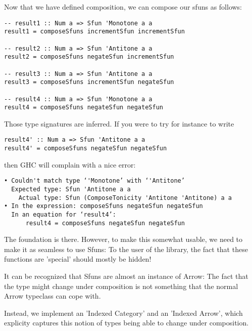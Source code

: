 \documentclass[11pt]{article}
\begin{document}
Now that we have defined composition, we can compose our sfuns as follows:

\begin{verbatim}
-- result1 :: Num a => Sfun 'Monotone a a
result1 = composeSfuns incrementSfun incrementSfun

-- result2 :: Num a => Sfun 'Antitone a a
result2 = composeSfuns negateSfun incrementSfun

-- result3 :: Num a => Sfun 'Antitone a a
result3 = composeSfuns incrementSfun negateSfun

-- result4 :: Num a => Sfun 'Monotone a a
result4 = composeSfuns negateSfun negateSfun

\end{verbatim}

Those type signatures are inferred. If you were to try for instance to write

\begin{verbatim}
result4' :: Num a => Sfun 'Antitone a a
result4' = composeSfuns negateSfun negateSfun
\end{verbatim}

then GHC will complain with a nice error:

\begin{verbatim}
• Couldn't match type ‘'Monotone’ with ‘'Antitone’
  Expected type: Sfun 'Antitone a a
    Actual type: Sfun (ComposeTonicity 'Antitone 'Antitone) a a
• In the expression: composeSfuns negateSfun negateSfun
  In an equation for ‘result4’:
      result4 = composeSfuns negateSfun negateSfun
\end{verbatim}

The foundation is there. However, to make this somewhat usable, we need to make it as seamless to use Sfuns:
To the user of the library, the fact that these functions are 'special' should mostly be hidden!

It can be recognized that Sfuns are almost an instance of Arrow: The fact that the type might change under composition
is not something that the normal Arrow typeclass can cope with.

Instead, we implement an 'Indexed Category' and an 'Indexed Arrow', which explicity captures this notion of types being able to change under composition.
\end{document}
